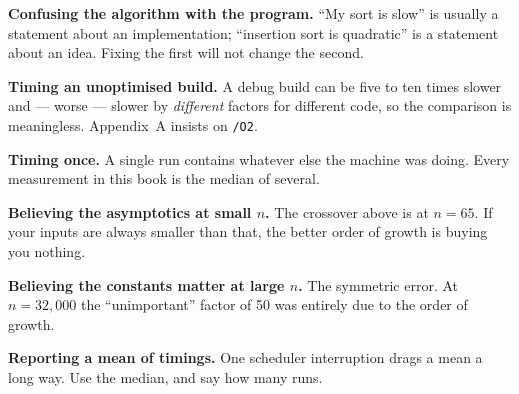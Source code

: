 \begin{pitfall}
\begin{tight}
  \item \textbf{Confusing the algorithm with the program.} ``My sort is slow''
        is usually a statement about an implementation; ``insertion sort is
        quadratic'' is a statement about an idea. Fixing the first will not
        change the second.
  \item \textbf{Timing an unoptimised build.} A debug build can be five to ten
        times slower and --- worse --- slower by \emph{different} factors for
        different code, so the comparison is meaningless. Appendix~A insists
        on \texttt{/O2}.
  \item \textbf{Timing once.} A single run contains whatever else the machine
        was doing. Every measurement in this book is the median of several.
  \item \textbf{Believing the asymptotics at small $n$.} The crossover above is
        at $n = 65$. If your inputs are always smaller than that, the better
        order of growth is buying you nothing.
  \item \textbf{Believing the constants matter at large $n$.} The symmetric
        error. At $n = 32{,}000$ the ``unimportant'' factor of 50 was entirely
        due to the order of growth.
  \item \textbf{Reporting a mean of timings.} One scheduler interruption drags
        a mean a long way. Use the median, and say how many runs.
\end{tight}
\end{pitfall}

